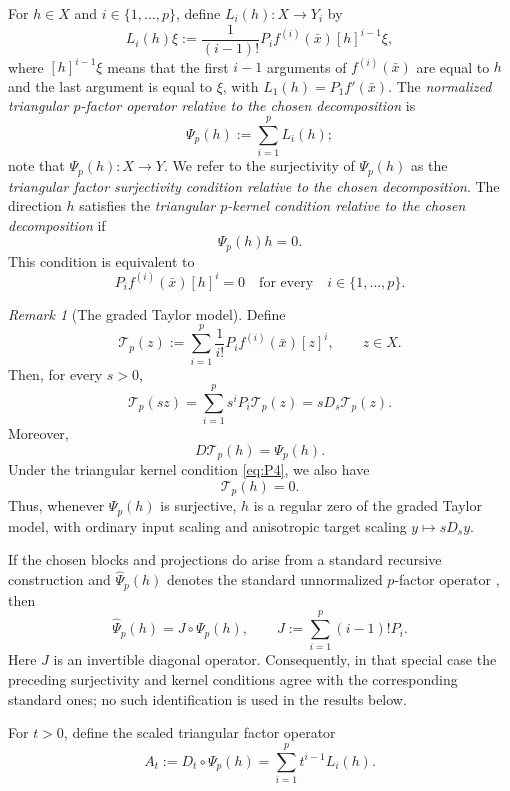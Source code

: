 \documentclass[11pt]{amsart}
\theoremstyle{definition}
\theoremstyle{remark}
\newtheorem{remark}[theorem]{Remark}
\newcommand{\bx}{\bar x}
\begin{document}
	For $h\in X$ and $i\in\{1,\ldots,p\}$, define
	$L_i(h):X\longrightarrow Y_i$ by
	\begin{equation*}
		L_i(h)\xi
		:=\frac{1}{(i-1)!}
		P_i f^{(i)}(\bx)[h]^{i-1}\xi,
	\end{equation*}
	where $[h]^{i-1}\xi$ means that the first $i-1$ arguments of
	$f^{(i)}(\bx)$ are equal to $h$ and the last argument is equal to $\xi$,
	with $L_1(h)=P_1f'(\bx)$.  The \emph{normalized triangular $p$-factor
		operator relative to the chosen decomposition} is
	\begin{equation*}
		\Psi_p(h):=\sum_{i=1}^pL_i(h);
	\end{equation*}
	note that $\Psi_p(h):X\longrightarrow Y$.
	We refer to the surjectivity of $\Psi_p(h)$ as the \emph{triangular factor
		surjectivity condition relative to the chosen decomposition}.  The direction
	$h$ satisfies the \emph{triangular $p$-kernel condition relative to the
		chosen decomposition} if
	\begin{equation}
		\Psi_p(h)h=0.
		\label{eq:P4}
	\end{equation}
	This condition is equivalent to
	$$
	P_i f^{(i)}(\bx)[h]^i=0
	\quad\text{for every}\quad i\in\{1,\ldots,p\}.
	$$
	\begin{remark}[The graded Taylor model]
		\label{rem:sussmann-dictionary}
		Define
		$$
		\mathcal T_p(z)
		:=
		\sum_{i=1}^p\frac{1}{i!}P_i f^{(i)}(\bx)[z]^i,
		\qquad z\in X.
		$$
		Then, for every $s>0$,
		$$
		\mathcal T_p(sz)
		=
		\sum_{i=1}^p s^iP_i\mathcal T_p(z)
		=
		sD_s\mathcal T_p(z).
		$$
		Moreover,
		$$
		D\mathcal T_p(h)=\Psi_p(h).
		$$
		Under the triangular kernel condition \eqref{eq:P4}, we also have
		$$
		\mathcal T_p(h)=0.
		$$
		Thus, whenever $\Psi_p(h)$ is surjective, $h$ is a regular zero of
		the graded Taylor model, with ordinary input scaling and anisotropic
		target scaling $y\mapsto sD_s y$.
	\end{remark}
	If the chosen blocks and projections do arise from a standard recursive
	construction and $\widehat\Psi_p(h)$ denotes the standard unnormalized
	$p$-factor operator \cite[Definition~4]{BednarczukEtAlSurvey}, then
	$$
	\widehat\Psi_p(h)=J\circ\Psi_p(h),
	\qquad
	J:=\sum_{i=1}^p(i-1)!P_i.
	$$
	Here $J$ is an invertible diagonal operator.
	Consequently, in that special case the preceding surjectivity and kernel
	conditions agree with the corresponding standard ones; no such
	identification is used in the results below.
	
	For $t>0$, define the scaled triangular factor operator
	\begin{equation}
		A_t:=D_t\circ\Psi_p(h)=\sum_{i=1}^pt^{i-1}L_i(h).
		\label{eq:P5}
	\end{equation}
	
\end{document}
